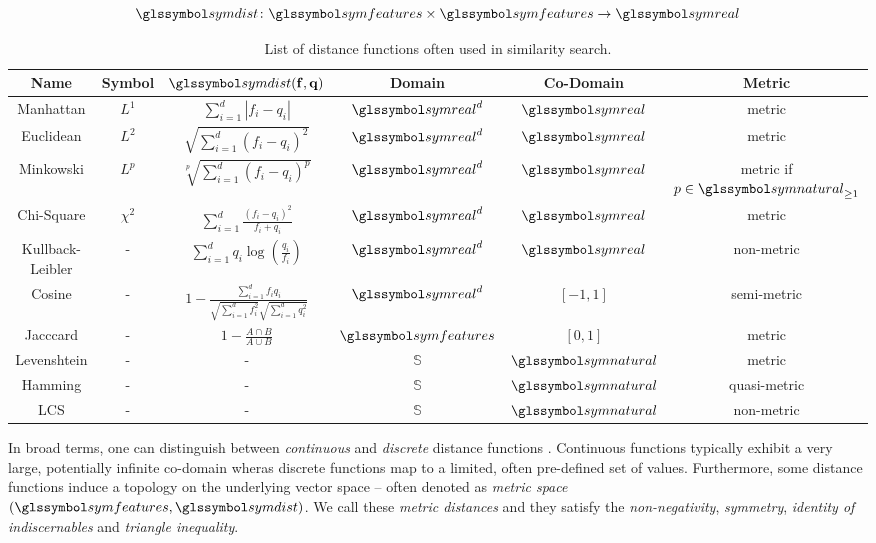 \begin{equation}
    \label{eq:distance_function}
    \symdist \colon \symfeatures \times \symfeatures \rightarrow \symreal
\end{equation}

\begin{table}[hb]
    \begin{tabular}{ | c | c | c | c | c | c |}
        \hline
        \textbf{Name} & \textbf{Symbol} &  $\symdist \mathbf{(f,q)}$ & \textbf{Domain} & \textbf{Co-Domain} & \textbf{Metric} \\
        \hline
        \hline 
        Manhattan & $L^1$ & $\sum_{i=1}^{d} | f_i - q_i |$ & $\symreal^d$ & $\symreal$ & metric \\ 
        \hline
        Euclidean & $L^2$ & $\sqrt{\sum_{i=1}^{d} (f_i - q_i)^2}$ & $\symreal^d$ & $\symreal$ & metric \\  
        \hline
        Minkowski & $L^p$ & $\sqrt[p]{\sum_{i=1}^{d} (f_i - q_i)^p}$ & $\symreal^d$ & $\symreal$ & metric if $p \in \symnatural_{\geq 1}$ \\ 
        \hline
        Chi-Square & $\chi^2$ & $\sum_{i=1}^{d} \frac{(f_i - q_i)^2}{f_i + q_i}$ & $\symreal^d$ & $\symreal$ & metric \\ 
        \hline
        Kullback-Leibler & - & $\sum_{i=1}^{d} q_i \log (\frac{q_i}{f_i})$ & $\symreal^d$ & $\symreal$ & non-metric \\ 
        \hline
        Cosine & - & $1 - \frac{\sum_{i=1}^{d} f_{i}q_{i}}{\sqrt{\sum_{i=1}^{d} f_i^2} \sqrt{\sum_{i=1}^{d} q_i^2}}$ & $\symreal^d$ & $[-1, 1]$ & semi-metric \\  
        \hline
        Jacccard & - & $1 - \frac{A \cap B}{A \cup B}$ & $\symfeatures$ & $[0, 1]$ & metric \\
        \hline
        Levenshtein & - & - & $\mathbb{S}$ & $\symnatural$ & metric \\
        \hline
        Hamming & - & - &  $\mathbb{S}$ & $\symnatural$ & quasi-metric \\
        \hline
        LCS \cite{Hirschberg:1977Algorithms} & - & - &  $\mathbb{S}$ & $\symnatural$ & non-metric \\
        \hline
    \end{tabular}
    \caption{List of distance functions often used in similarity search.}
    \label{table:similarity_measures}
\end{table}

In broad terms, one can distinguish between \emph{continuous} and \emph{discrete} distance functions \cite{Zezula:2006Similarity}. Continuous functions typically exhibit a very large, potentially infinite co-domain wheras discrete functions map to a limited, often pre-defined set of values. Furthermore, some distance functions induce a topology on the underlying vector space -- often denoted as  \emph{metric space} $(\symfeatures, \symdist)$. We call these \emph{metric distances} and they satisfy the \emph{non-negativity}, \emph{symmetry}, \emph{identity of indiscernables} and \emph{triangle inequality}. 

